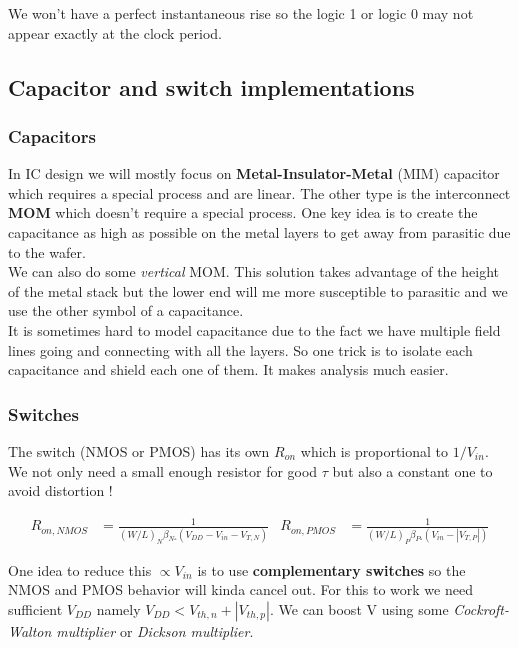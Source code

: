 \documentclass[
  a4paper,
]{article}
\begin{document}
We won't have a perfect instantaneous rise so the logic 1 or logic 0 may
not appear exactly at the clock period.

\hypertarget{capacitor-and-switch-implementations}{%
\subsection{Capacitor and switch
implementations}\label{capacitor-and-switch-implementations}}

\hypertarget{capacitors}{%
\subsubsection{Capacitors}\label{capacitors}}

In IC design we will mostly focus on \textbf{Metal-Insulator-Metal}
(MIM) capacitor which requires a special process and are linear. The
other type is the interconnect \textbf{MOM} which doesn't require a
special process. One key idea is to create the capacitance as high as
possible on the metal layers to get away from parasitic due to the
wafer.\\
We can also do some \emph{vertical} MOM. This solution takes advantage
of the height of the metal stack but the lower end will me more
susceptible to parasitic and we use the other symbol of a capacitance.\\
It is sometimes hard to model capacitance due to the fact we have
multiple field lines going and connecting with all the layers. So one
trick is to isolate each capacitance and shield each one of them. It
makes analysis much easier.

\hypertarget{switches}{%
\subsubsection{Switches}\label{switches}}

The switch (NMOS or PMOS) has its own \(R_{on}\) which is proportional
to \(1/V_{in}\). We not only need a small enough resistor for good
\(\tau\) but also a constant one to avoid distortion !

\[\begin{aligned}
R_{o n, N M O S} & =\frac{1}{(W / L)_N \beta_{N \square}\left(V_{D D}-V_{i n}-V_{T, N}\right)} &
R_{o n, P M O S} & =\frac{1}{(W / L)_P \beta_{P \square}\left(V_{i n}-\left|V_{T, P}\right|\right)}
\end{aligned}\]

One idea to reduce this \(\propto V_{in}\) is to use
\textbf{complementary switches} so the NMOS and PMOS behavior will kinda
cancel out. For this to work we need sufficient \(V_{DD}\) namely
\(V_{DD} < V_{th,n} + |V_{th,p}|\). We can boost V using some
\emph{Cockroft-Walton multiplier} or \emph{Dickson multiplier}.
\end{document}

